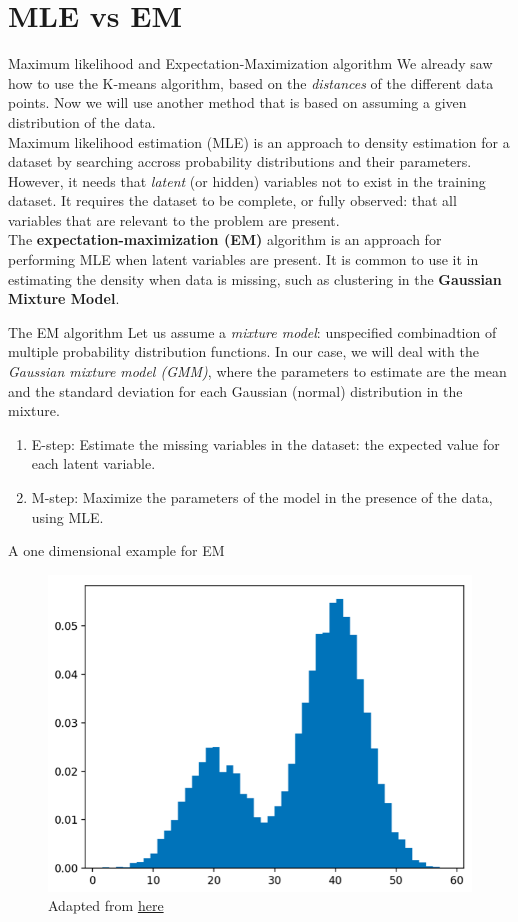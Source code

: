 \documentclass{beamer}
\begin{document}
\section{MLE vs EM}
\begin{frame}{Maximum likelihood and Expectation-Maximization algorithm}
    We already saw how to use the K-means algorithm, based on the {\em distances} of the different data points. Now we will use another method that is based on assuming a given distribution of the data. 
    \\[10pt]
    Maximum likelihood estimation (MLE) is an approach to density estimation for a dataset by searching accross probability distributions and their parameters. However, it needs that {\em latent} (or hidden) variables not to exist in the training dataset. It requires the dataset to be complete, or fully observed: that all variables that are relevant to the problem are present.
    \\[10pt]
    The {\bf expectation-maximization (EM)} algorithm is an approach for performing MLE when latent variables are present. It is common to use it in estimating the density when data is missing, such as clustering in the {\bf Gaussian Mixture Model}.
\end{frame}

\begin{frame}{The EM algorithm}
    Let us assume a {\em mixture model}: unspecified combinadtion of multiple probability distribution functions. In our case, we will deal with the {\em Gaussian mixture model (GMM)}, where the parameters to estimate are the mean and the standard deviation for each Gaussian (normal) distribution in the mixture.
    \begin{enumerate}
        \item E-step: Estimate the missing variables in the dataset: the expected value for each latent variable.
        \item M-step: Maximize the parameters of the model in the presence of the data, using MLE.
    \end{enumerate}
\end{frame}

\begin{frame}{A one dimensional example for EM}
    \begin{figure}
        \includegraphics[width=0.7\linewidth]{hist}
        \caption{Adapted from \href{https://machinelearningmastery.com/expectation-maximization-em-algorithm/}{here}}
    \end{figure}
\end{frame}
\end{document}
